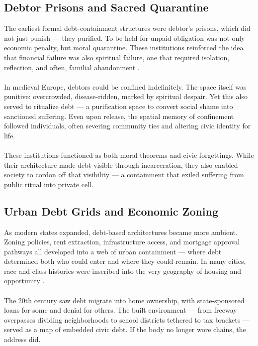 \documentclass[12pt]{article}
\begin{document}
\subsection{Debtor Prisons and Sacred Quarantine}

The earliest formal debt-containment structures were debtor’s prisons, which did not just punish — they purified. To be held for unpaid obligation was not only economic penalty, but moral quarantine. These institutions reinforced the idea that financial failure was also spiritual failure, one that required isolation, reflection, and often, familial abandonment \parencite{foucault1977discipline, davis2003are}.

\paragraph{} In medieval Europe, debtors could be confined indefinitely. The space itself was punitive: overcrowded, disease-ridden, marked by spiritual despair. Yet this also served to ritualize debt — a purification space to convert social shame into sanctioned suffering. Even upon release, the spatial memory of confinement followed individuals, often severing community ties and altering civic identity for life.

\paragraph{} These institutions functioned as both moral theorems and civic forgettings. While their architecture made debt visible through incarceration, they also enabled society to cordon off that visibility — a containment that exiled suffering from public ritual into private cell.

\subsection{Urban Debt Grids and Economic Zoning}

As modern states expanded, debt-based architectures became more ambient. Zoning policies, rent extraction, infrastructure access, and mortgage approval pathways all developed into a web of urban containment — where debt determined both who could enter and where they could remain. In many cities, race and class histories were inscribed into the very geography of housing and opportunity \parencite{smith2001contours, coates2015between}.

\paragraph{} The 20th century saw debt migrate into home ownership, with state-sponsored loans for some and denial for others. The built environment — from freeway overpasses dividing neighborhoods to school districts tethered to tax brackets — served as a map of embedded civic debt. If the body no longer wore chains, the address did.
\end{document}

